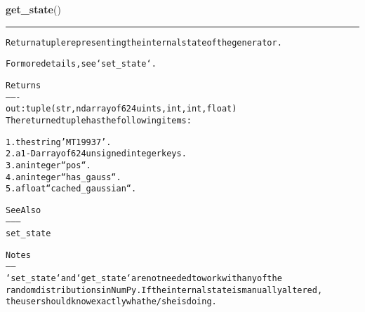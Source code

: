     \vspace{0.5ex}

\hspace{.8\funcindent}\begin{boxedminipage}{\funcwidth}

    \raggedright \textbf{get\_state}()

    \vspace{-1.5ex}

    \rule{\textwidth}{0.5\fboxrule}
\setlength{\parskip}{2ex}
\begin{alltt}
Return a tuple representing the internal state of the generator.

For more details, see `set\_state`.

Returns
-------
out : tuple(str, ndarray of 624 uints, int, int, float)
    The returned tuple has the following items:

    1. the string 'MT19937'.
    2. a 1-D array of 624 unsigned integer keys.
    3. an integer ``pos``.
    4. an integer ``has\_gauss``.
    5. a float ``cached\_gaussian``.

See Also
--------
set\_state

Notes
-----
`set\_state` and `get\_state` are not needed to work with any of the
random distributions in NumPy. If the internal state is manually altered,
the user should know exactly what he/she is doing.
\end{alltt}

\setlength{\parskip}{1ex}
    \end{boxedminipage}

    \label{QSTK:qstklearn:mldiagnostics:gumbel}

    \vspace{0.5ex}

